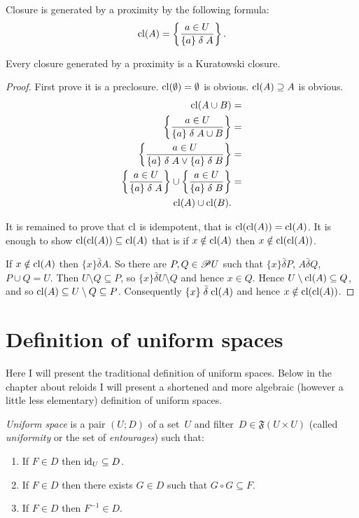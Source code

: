 \begin{defn}
Closure is generated by a proximity by the following formula:
\[
\operatorname{cl}(A)=\left\{ \frac{a\in U}{\{a\}\mathrel\delta A}\right\}.
\]
\end{defn}
\begin{prop}
Every closure generated by a proximity is a Kuratowski closure.\end{prop}
\begin{proof}
First prove it is a preclosure. $\operatorname{cl}(\emptyset)=\emptyset$ is obvious.
$\operatorname{cl}(A)\supseteq A$ is obvious.
\begin{align*}
\operatorname{cl}(A\cup B) & =\\
\left\{ \frac{a\in U}{\{a\}\mathrel\delta A\cup B}\right\} & =\\
\left\{ \frac{a\in U}{\{a\}\mathrel\delta A\lor\{a\}\mathrel\delta B}\right\} & =\\
\left\{ \frac{a\in U}{\{a\}\mathrel\delta A}\right\}\cup\left\{ \frac{a\in U}{\{a\}\mathrel\delta B}\right\} & =\\
\operatorname{cl}(A)\cup\operatorname{cl}(B).
\end{align*}


It is remained to prove that $\operatorname{cl}$ is idempotent, that is $\operatorname{cl}(\operatorname{cl}(A))=\operatorname{cl}(A)$.
It is enough to show $\operatorname{cl}(\operatorname{cl}(A))\subseteq\operatorname{cl}(A)$ that is if $x\notin\operatorname{cl}(A)$
then $x\notin\operatorname{cl}(\operatorname{cl}(A))$.

If $x\notin\operatorname{cl}(A)$ then $\{x\}\mathrel{\bar{\delta}}A$. So there
are $P,Q\in\mathscr{P} U$ such that $\{x\}\mathrel{\bar{\delta}}P$,
$A\mathrel{\bar{\delta}}Q$, $P\cup Q=U$. Then $U\setminus Q\subseteq P$,
so $\{x\}\mathrel{\bar{\delta}}U\setminus Q$ and hence $x\in Q$.
Hence $U\setminus\operatorname{cl}(A)\subseteq Q$, and so $\operatorname{cl}(A)\subseteq U\setminus Q\subseteq P$.
Consequently $\{x\}\mathrel{\bar{\delta}}\operatorname{cl}(A)$ and hence $x\notin\operatorname{cl}(\operatorname{cl}(A))$.
\end{proof}

\section{Definition of uniform spaces}

Here I will present the traditional definition of uniform spaces.
Below in the chapter about reloids I will present a shortened and
more algebraic (however a little less elementary) definition of uniform
spaces.
\begin{defn}
\emph{Uniform space} is a pair $(U;D)$ of a set~$U$ and filter~$D\in\mathfrak{F}(U\times U)$
(called \emph{uniformity} or the set of \emph{entourages}) such that:
\begin{enumerate}
\item If $F\in D$ then $\operatorname{id}_{U}\subseteq D$.
\item If $F\in D$ then there exists $G\in D$ such that $G\circ G\subseteq F$.
\item If $F\in D$ then $F^{-1}\in D$.\end{enumerate}
\end{defn}

